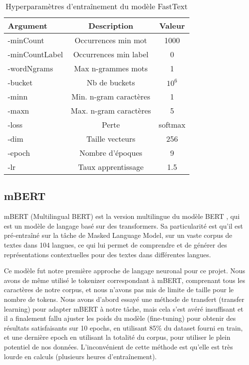 \begin{table}[h]
    \centering
    \small
    \begin{tabular}{lcc}
        \hline
        \textbf{Argument} & \textbf{Description} & \textbf{Valeur} \\
        \hline
        -minCount & Occurrences min mot & 1000 \\
        -minCountLabel & Occurrences min label & 0 \\
        -wordNgrams & Max n-grammes mots & 1 \\
        -bucket & Nb de buckets & $10^6$ \\
        -minn & Min. n-gram caractères & 1 \\
        -maxn & Max. n-gram caractères & 5 \\
        -loss & Perte & softmax \\
        -dim & Taille vecteurs & 256 \\
        -epoch & Nombre d'époques & 9 \\
        -lr & Taux apprentissage & 1.5 \\
        \hline
    \end{tabular}
    \caption{Hyperparamètres d'entraînement du modèle FastText}
    \label{tab:glotlid-m-hyperparams}
\end{table}

\subsection{mBERT}

mBERT (Multilingual BERT) est la version multilingue du modèle BERT \cite{devlin2019bert}, qui est un modèle de langage basé sur des transformers. Sa particularité est qu'il est pré-entraîné sur la tâche de Masked Language Model, sur un vaste corpus de textes dans 104 langues, ce qui lui permet de comprendre et de générer des représentations contextuelles pour des textes dans différentes langues.

Ce modèle fut notre première approche de langage neuronal pour ce projet.  Nous avons de même utilisé le tokenizer correspondant à mBERT, comprenant tous les caractères de notre corpus, et nous n'avons pas mis de limite de taille pour le nombre de tokens. Nous avons d'abord essayé une méthode de transfert (transfer learning) pour adapter mBERT à notre tâche, mais cela s'est avéré insuffisant et il a finalement fallu ajuster les poids du modèle (fine-tuning) pour obtenir des résultats satisfaisants sur 10 epochs, en utilisant 85\% du dataset fourni en train, et une dernière epoch en utilisant la totalité du corpus, pour utiliser le plein potentiel de nos données. L'inconvénient de cette méthode est qu'elle est très lourde en calculs (plusieurs heures d'entraînement).

